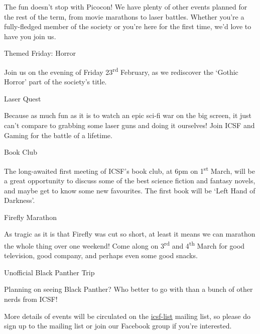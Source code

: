 The fun doesn't stop with Picocon! We have plenty of other events planned for the rest of the term, from movie marathons to laser battles. Whether you're a fully-fledged member of the society or you're here for the first time, we'd love to have you join us. 

\vspace{4mm} {\Large Themed Friday: Horror}

Join us on the evening of Friday 23\textsuperscript{rd} February, as we rediscover the `Gothic Horror' part of the society's title. 

\vspace{4mm} {\Large Laser Quest}

Because as much fun as it is to watch an epic sci-fi war on the big screen, it just can't compare to grabbing some laser guns and doing it ourselves! Join ICSF and Gaming for the battle of a lifetime.

\vspace{4mm} {\Large Book Club}

The long-awaited first meeting of ICSF's book club, at 6pm on 1\textsuperscript{st} March, will be a great opportunity to discuss some of the best science fiction and fantasy novels, and maybe get to know some new favourites. The first book will be `Left Hand of Darkness'.

\vspace{4mm} {\Large Firefly Marathon}

As tragic as it is that Firefly was cut so short, at least it means we can marathon the whole thing over one weekend! Come along on 3\textsuperscript{rd} and 4\textsuperscript{th} March for good television, good company, and perhaps even some good snacks.

\vspace{4mm} {\Large Unofficial Black Panther Trip}

Planning on seeing Black Panther? Who better to go with than a bunch of other nerds from ICSF!

\vspace{4mm} 
More details of events will be circulated on the \url{icsf-list} mailing list, so please do sign up to the mailing list or join our Facebook group if you're interested.